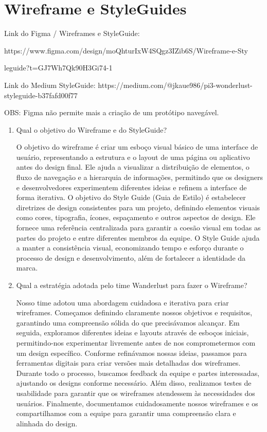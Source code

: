 \documentclass{article}
\begin{document}
\section{Wireframe e StyleGuides}
Link do Figma / Wireframes e StyleGuide:

https://www.figma.com/design/moQhturIxW4SQgz3IZib6S/Wireframe-e-Sty

leguide?t=GJ7Wh7Qk90H3Gi74-1

\bigskip

Link do Medium StyleGuide: https://medium.com/@jkaue986/pi3-wonderlust-styleguide-b37fafd00f77

\bigskip

OBS: Figma não permite mais a criação de um protótipo navegável.
\begin{enumerate}
      \item Qual o objetivo do Wireframe e do StyleGuide?

            O objetivo do wireframe é criar um esboço visual básico de uma interface de usuário, representando a estrutura e o layout de uma página ou aplicativo antes do design final. Ele ajuda a visualizar a distribuição de elementos, o fluxo de navegação e a hierarquia de informações, permitindo que os designers e desenvolvedores experimentem diferentes ideias e refinem a interface de forma iterativa.
            O objetivo do Style Guide (Guia de Estilo) é estabelecer diretrizes de design consistentes para um projeto, definindo elementos visuais como cores, tipografia, ícones, espaçamento e outros aspectos de design. Ele fornece uma referência centralizada para garantir a coesão visual em todas as partes do projeto e entre diferentes membros da equipe. O Style Guide ajuda a manter a consistência visual, economizando tempo e esforço durante o processo de design e desenvolvimento, além de fortalecer a identidade da marca.

      \item Qual a estratégia adotada pelo time Wanderlust para fazer o Wireframe?

            Nosso time adotou uma abordagem cuidadosa e iterativa para criar wireframes. Começamos definindo claramente nossos objetivos e requisitos, garantindo uma compreensão sólida do que precisávamos alcançar. Em seguida, exploramos diferentes ideias e layouts através de esboços iniciais, permitindo-nos experimentar livremente antes de nos comprometermos com um design específico. Conforme refinávamos nossas ideias, passamos para ferramentas digitais para criar versões mais detalhadas dos wireframes. Durante todo o processo, buscamos feedback da equipe e partes interessadas, ajustando os designs conforme necessário. Além disso, realizamos testes de usabilidade para garantir que os wireframes atendessem às necessidades dos usuários. Finalmente, documentamos cuidadosamente nossos wireframes e os compartilhamos com a equipe para garantir uma compreensão clara e alinhada do design.


\end{enumerate}
\end{document}
